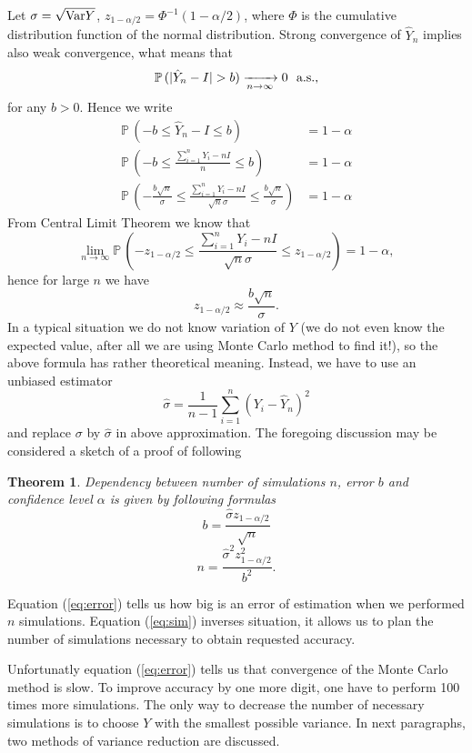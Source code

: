\documentclass[a4paper,11pt, twoside]{book}
\newtheorem{thm}{Theorem}[chapter]
\theoremstyle{definition}
\theoremstyle{remark}
\def\Var{{\rm Var}}
\def\P{{\mathbb{P}}\,}
\def\conv{\xrightarrow[n \rightarrow \infty]{}}
\def\limn{\lim\limits_{n \rightarrow \infty} }
\begin{document}
Let $\sigma = \sqrt{\Var{Y}}$, $z_{1-\alpha/2} = \Phi^{-1}(1-\alpha/2)$, where $\Phi$ is the cumulative distribution function of the normal distribution.
Strong convergence of $\hat{Y}_n$ implies also weak convergence, what means that
\[ \P(|\hat{Y}_n - I| > b) \conv 0 \hbox{\ \ a.s.,} \]
for any $b > 0$. 
Hence we write
\begin{align*}
 \P(-b \leq \hat{Y}_n - I \leq b) &= 1 - \alpha\\
 \P(-b \leq \frac{\sum\limits_{i=1}^n Y_i - nI}{n}  \leq b) &= 1 - \alpha\\
 \P(-\frac{b\sqrt{n}}{\sigma} \leq \frac{\sum\limits_{i=1}^n Y_i - nI}{\sqrt{n}\sigma}  \leq \frac{b\sqrt{n}}{\sigma}) &= 1 - \alpha
\end{align*}
From Central Limit Theorem we know that
\[ \limn \P(-z_{1-\alpha/2} \leq \frac{\sum\limits_{i=1}^n Y_i - nI}{\sqrt{n}\sigma}  \leq z_{1-\alpha/2}) = 1 - \alpha, \]
hence for large $n$ we have
\[z_{1-\alpha/2} \approx \frac{b\sqrt{n}}{\sigma}.\]
In a typical situation we do not know variation of $Y$ (we do not even know the expected value, after all we are using Monte Carlo method to find it!), so the above formula has rather theoretical meaning.
Instead, we have to use an unbiased estimator
\[ \hat{\sigma} = \frac{1}{n-1}\sum\limits_{i=1}^n (Y_i - \hat{Y}_n)^2 \]
and replace $\sigma$ by $\hat{\sigma}$ in above approximation. The foregoing discussion may be considered a sketch of a proof of following
\begin{thm}
 Dependency between number of simulations $n$, error $b$ and confidence level $\alpha$ is given by following formulas
 \begin{equation}
   \label{eq:error}
   b = \frac{\hat{\sigma} z_{1-\alpha/2}}{\sqrt{n}}
 \end{equation}
 \begin{equation}
   \label{eq:sim}
   n = \frac{\hat{\sigma}^2 z_{1-\alpha/2}^2}{b^2}.
 \end{equation}
\end{thm}
\noindent Equation (\ref{eq:error}) tells us how big is an error of estimation when we performed $n$ simulations. Equation (\ref{eq:sim}) inverses situation, it allows us to plan the number of simulations necessary to obtain requested accuracy.

Unfortunatly equation (\ref{eq:error}) tells us that convergence of the Monte Carlo method is slow. To improve accuracy by one more digit, one have to perform 100 times more simulations. The only way to decrease the number of necessary simulations is to choose $Y$ with the smallest possible variance. In next paragraphs, two methods of variance reduction are discussed.
\end{document}
